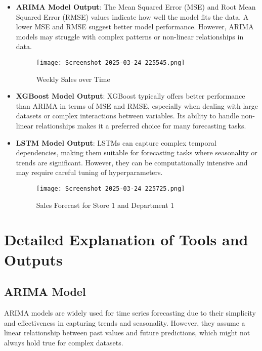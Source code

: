 \documentclass{article}
\begin{document}
\begin{itemize}
    \item \textbf{ARIMA Model Output}: The Mean Squared Error (MSE) and Root Mean Squared Error (RMSE) values indicate how well the model fits the data. A lower MSE and RMSE suggest better model performance. However, ARIMA models may struggle with complex patterns or non-linear relationships in data.
    
    \begin{figure}[h]
        \centering
        \texttt{[image: Screenshot 2025-03-24 225545.png]}
        \caption{Weekly Sales over Time}
        \label{fig:sales_over_time}
    \end{figure}
    
    \item \textbf{XGBoost Model Output}: XGBoost typically offers better performance than ARIMA in terms of MSE and RMSE, especially when dealing with large datasets or complex interactions between variables. Its ability to handle non-linear relationships makes it a preferred choice for many forecasting tasks.
    \item \textbf{LSTM Model Output}: LSTMs can capture complex temporal dependencies, making them suitable for forecasting tasks where seasonality or trends are significant. However, they can be computationally intensive and may require careful tuning of hyperparameters.
    
    \begin{figure}[h]
        \centering
        \texttt{[image: Screenshot 2025-03-24 225725.png]}
        \caption{Sales Forecast for Store 1 and Department 1}
        \label{fig:sales_forecast}
    \end{figure}
\end{itemize}

\section{Detailed Explanation of Tools and Outputs}
\subsection{ARIMA Model}
ARIMA models are widely used for time series forecasting due to their simplicity and effectiveness in capturing trends and seasonality. However, they assume a linear relationship between past values and future predictions, which might not always hold true for complex datasets.
\end{document}
